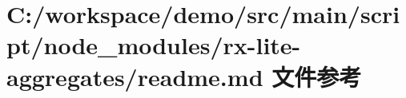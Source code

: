 \hypertarget{node__modules_2rx-lite-aggregates_2_r_e_a_d_m_e_8md}{}\section{C\+:/workspace/demo/src/main/script/node\+\_\+modules/rx-\/lite-\/aggregates/readme.md 文件参考}
\label{node__modules_2rx-lite-aggregates_2_r_e_a_d_m_e_8md}
